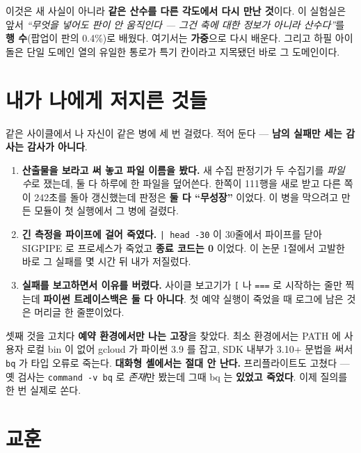 \documentclass[10pt]{article}
\begin{document}

이것은 새 사실이 아니라 \textbf{같은 산수를 다른 각도에서 다시 만난
것}이다. 이 실험실은 앞서 \emph{``무엇을 넣어도 판이 안 움직인다 ---
그건 축에 대한 정보가 아니라 산수다''}를 \textbf{행 수}(팝업이 판의
0.4\%)로 배웠다. 여기서는 \textbf{가중}으로 다시 배운다. 그리고 하필
아이돌은 단일 도메인 열의 유일한 통로가 특기 칸이라고 지목됐던 바로 그
도메인이다.

\section{내가 나에게 저지른 것들}

같은 사이클에서 나 자신이 같은 병에 세 번 걸렸다. 적어 둔다 ---
\textbf{남의 실패만 세는 감사는 감사가 아니다}.

\begin{enumerate}\itemsep3pt
\item \textbf{산출물을 보라고 써 놓고 파일 이름을 봤다.} 새 수집 판정기가
      두 수집기를 \emph{파일 수}로 쟀는데, 둘 다 하루에 한 파일을
      덮어쓴다. 한쪽이 111행을 새로 받고 다른 쪽이 242초를 돌아 갱신했는데
      판정은 \textbf{둘 다 ``무성장''} 이었다. 이 병을 막으려고 만든
      모듈이 첫 실행에서 그 병에 걸렸다.
\item \textbf{긴 측정을 파이프에 걸어 죽였다.} \verb#| head -30# 이
      30줄에서 파이프를 닫아 SIGPIPE 로 프로세스가 죽었고 \textbf{종료
      코드는 0} 이었다. 이 논문 1절에서 고발한 바로 그 실패를 몇 시간
      뒤 내가 저질렀다.
\item \textbf{실패를 보고하면서 이유를 버렸다.} 사이클 보고기가
      \texttt{[} 나 \texttt{===} 로 시작하는 줄만 찍는데
      \textbf{파이썬 트레이스백은 둘 다 아니다}. 첫 예약 실행이 죽었을 때
      로그에 남은 것은 머리글 한 줄뿐이었다.
\end{enumerate}

셋째 것을 고치다 \textbf{예약 환경에서만 나는 고장}을 찾았다. 최소
환경에서는 PATH 에 사용자 로컬 bin 이 없어 gcloud 가 파이썬 3.9 를
잡고, SDK 내부가 3.10+ 문법을 써서 \texttt{bq} 가 타입 오류로 죽는다.
\textbf{대화형 셸에서는 절대 안 난다.} 프리플라이트도 고쳤다 ---
옛 검사는 \verb|command -v bq| 로 \emph{존재}만 봤는데 그때 bq 는
\textbf{있었고 죽었다}. 이제 질의를 한 번 실제로 쏜다.

\section{교훈}
\end{document}
